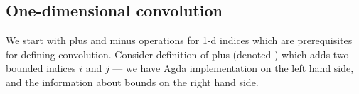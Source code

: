 \subsection{One-dimensional convolution}
We start with plus and minus operations for 1-d indices which are
prerequisites for defining convolution.  Consider definition of plus
(denoted ) which adds two bounded indices $i$ and $j$ ---
we have Agda implementation on the left hand side, and the information
about bounds on the right hand side.
\begin{code}[hide]%
%
\>[2]\AgdaSpace{}%
\AgdaSymbol{:}\AgdaSpace{}%
\AgdaSpace{}%
\AgdaSymbol{(}\AgdaSpace{}%
\AgdaSymbol{)}\AgdaSpace{}%
\AgdaSpace{}%
\AgdaSpace{}%
\AgdaSymbol{(}\AgdaSpace{}%
\AgdaSymbol{(}\AgdaSpace{}%
\AgdaOperator{\AgdaPrimitive{+}}\AgdaSpace{}%
\AgdaSymbol{))}\<%
\\
%
\>[2]\AgdaSpace{}%
\AgdaSymbol{\{}\AgdaSymbol{\}}\AgdaSpace{}%
\AgdaSymbol{\{}\AgdaSymbol{\}}\AgdaSpace{}%
\AgdaSpace{}%
\AgdaSpace{}%
\AgdaSpace{}%
\AgdaSpace{}%
%
\>[44]\AgdaSymbol{=}\AgdaSpace{}%
\AgdaSpace{}%
\AgdaSymbol{\AgdaUnderscore{}}\AgdaSpace{}%
\<%
\\
\>[0]\<%
\\
%
\>[2]\AgdaSpace{}%
\AgdaSymbol{:}\AgdaSpace{}%
\AgdaSymbol{(}\AgdaSpace{}%
\AgdaSymbol{:}\AgdaSpace{}%
\AgdaSpace{}%
\AgdaSymbol{(}\AgdaSpace{}%
\AgdaOperator{\AgdaPrimitive{+}}\AgdaSpace{}%
\AgdaSymbol{))}\AgdaSpace{}%
\AgdaSymbol{(}\AgdaSpace{}%
\AgdaSymbol{:}\AgdaSpace{}%
\AgdaSpace{}%
\AgdaSymbol{)}\AgdaSpace{}%
\AgdaSpace{}%
\AgdaSpace{}%
\AgdaSpace{}%
\AgdaSpace{}%
\AgdaSpace{}%
\AgdaSpace{}%
\AgdaSpace{}%
\AgdaSpace{}%
\AgdaSpace{}%
\AgdaSymbol{\AgdaUnderscore{}}\AgdaSpace{}%
\AgdaSpace{}%
\AgdaSpace{}%
\<%
\\
%
\>[2]\AgdaSpace{}%

\end{code}
